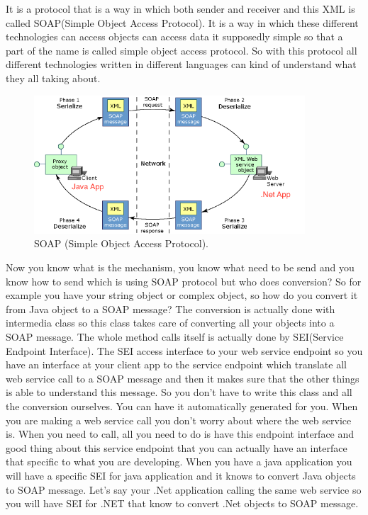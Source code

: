 It is a protocol that is a way in which both sender and receiver and this XML is called SOAP(Simple Object Access Protocol). It is a way in which these different technologies can access objects can access data it supposedly simple so that a part of the name is called simple object access protocol. So with this protocol all different technologies written in different languages can kind of understand what they all taking about.

\begin{figure}[!htb]
  \centering
  \includegraphics[width=0.9\textwidth]{Figures/soap.png}
  \caption[SOAP (Simple Object Access Protocol).]{SOAP (Simple Object Access Protocol).}
  \label{fig:wsdl}
\end{figure}

Now you know what is the mechanism, you know what need to be send and you know how to send which is using SOAP protocol but who does conversion? So for example you have your string object or complex object, so how do you convert it from Java object to a SOAP message? The conversion is actually done with intermedia class so this class takes care of converting all your objects into a SOAP message. The whole method calls itself is actually done by SEI(Service Endpoint Interface)\citep{thesis:state5}. The SEI access interface to your web service endpoint so you have an interface at your client app to the service endpoint which translate all web service
call to a SOAP message and then it makes sure that the other things is able to understand this message. So you don’t have to write this class and all the conversion ourselves. You can have it automatically generated for you. When you are making a web service call you don’t worry about where the web service is. When you need to call, all you need to do is have this endpoint interface and good thing about this service endpoint that you can actually have an interface that specific to what you are developing. When you have a java application you will have a specific SEI for java application and it knows to convert Java objects to SOAP message. Let’s say your .Net application calling the same web service so you will have SEI for .NET that know to convert .Net objects to SOAP message.

